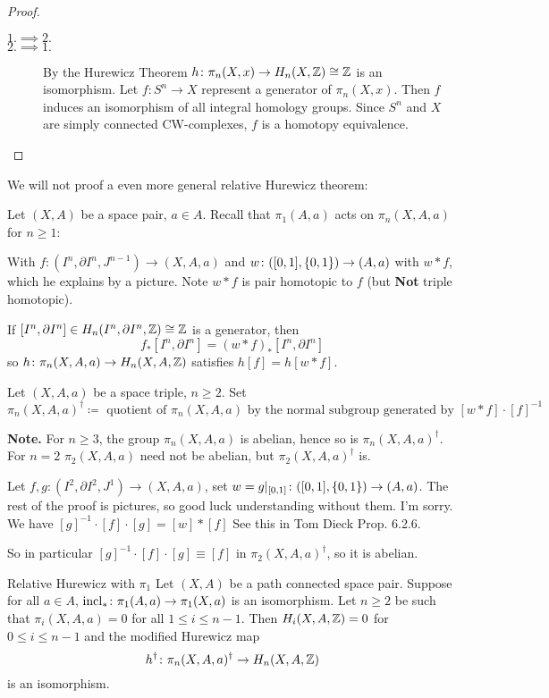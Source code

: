 \documentclass[language=english]{TemplateLecture}
\begin{document}
\begin{proof}
    \begin{description}
        \item[\(1. \implies 2.\)] 
        \item[\(2. \implies 1.\)] By the Hurewicz Theorem \(h\colon \pi_n(X,x) \to H_n(X,\mathbb{Z})\cong \mathbb{Z}\) is an isomorphism. Let \(f\colon S^n\to X\) represent a generator of \(\pi_n(X,x)\). Then \(f\) induces an isomorphism of all integral homology groups. Since \(S^n\) and \(X\) are simply connected CW-complexes, \(f\) is a homotopy equivalence.
    \end{description}
\end{proof}

We will not proof a even more general relative Hurewicz theorem:

Let \((X,A)\) be a space pair, \(a \in A\). Recall that \(\pi_1(A,a)\) acts on \(\pi_n(X,A,a)\) for \(n\geq 1\):

With \(f\colon (I^n, \partial I^n, J^{n-1})\to (X,A,a)\) and \(w\colon ([0,1], \{0,1\}) \to (A,a)\) with \(w * f\), which he explains by a picture. Note \(w*f\) is pair homotopic to \(f\) (but \textbf{Not} triple homotopic).

If \([I^n, \partial I^n] \in H_n(I^n, \partial I^n, \mathbb{Z}) \cong \mathbb{Z}\) is a generator, then
\[f_*[I^n, \partial I^n] = (w*f)_*[I^n, \partial I^n]\]
so \(h\colon \pi_n(X,A,a) \to H_n(X,A, \mathbb{Z})\) satisfies \(h[f] = h[w*f]\).

\begin{defi}{}{}
    Let \((X,A,a)\) be a space triple, \(n\geq 2\). Set
    \[\pi_n(X,A,a)^\dagger \coloneq \text{ quotient of } \pi_n(X,A,a) \text{ by the normal subgroup generated by } [w*f]\cdot [f]^{-1}\]
\end{defi}

\textbf{Note.} For \(n \geq 3\), the group \(\pi_n(X,A,a)\) is abelian, hence so is \(\pi_n(X,A,a)^\dagger\). For \(n = 2\) \(\pi_2(X,A,a)\) need not be abelian, but \(\pi_2(X,A,a)^\dagger\) is.

Let \(f,g\colon (I^2, \partial I^2, J^1)\to (X,A,a)\), set \(w = g\rvert_{[0,1]}\colon ([0,1], \{0,1\})\to (A,a)\). The rest of the proof is pictures, so good luck understanding without them. I'm sorry. We have \([g]^{-1}\cdot[f]\cdot[g]= [w]*[f]\) See this in Tom Dieck Prop. 6.2.6.

So in particular \([g]^{-1}\cdot[f]\cdot[g] \equiv [f]\) in \(\pi_2(X,A,a)^\dagger\), so it is abelian.

\begin{thm}{Relative Hurewicz with \(\pi_1\)}{}
    Let \((X,A)\) be a path connected space pair. Suppose for all \(a \in A\), \(\operatorname{incl}_*\colon \pi_1(A,a)\to \pi_1(X,a)\) is an isomorphism. Let \(n\geq 2\) be such that \(\pi_i(X,A,a) = 0\) for all \(1\leq i \leq n-1\). Then \(H_i(X,A,\mathbb{Z}) = 0\) for \(0\leq i \leq n-1\) and the modified Hurewicz map
    \[h^\dagger \colon \pi_n(X,A,a)^\dagger \to H_n(X,A,\mathbb{Z})\]
    is an isomorphism.
\end{thm}
\end{document}
